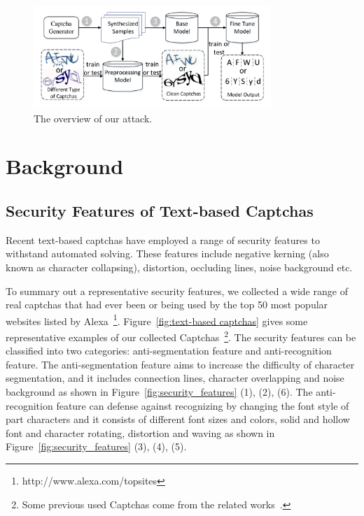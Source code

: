 \begin{figure}[!t]
  \centering
  \includegraphics[width=0.8\textwidth]{fig/overview/overview.pdf}
  \caption{The overview of our attack.}
  \label{fig:overview}
\end{figure}

\section{Background}
\subsection{Security Features of Text-based Captchas \label{section: security_features}}
Recent text-based captchas have employed a range of security features to withstand automated solving. These features include negative
kerning (also known as character collapsing), distortion, occluding lines, noise background etc.

To summary out a representative security features, we collected a wide range of real captchas that had ever been or being used by the top 50 most popular websites listed by Alexa~\footnote{http://www.alexa.com/topsites}. Figure~\ref{fig:text-based captchas} gives some representative examples of our collected Captchas~\footnote{Some previous used Captchas come from the related works~\cite{Gao2013The,Gao2016A,Bursztein2011Text}.}.
The security features can be classified into two categories: anti-segmentation feature and anti-recognition feature. The anti-segmentation feature aims to increase the difficulty of character segmentation, and it includes connection lines, character overlapping and noise background as shown in Figure~\ref{fig:security_features} (1), (2), (6). 
The anti-recognition feature can defense against recognizing by changing the font style of part characters and it consists of different font sizes and colors, solid and hollow font and character rotating, distortion and waving as shown in Figure~\ref{fig:security_features} (3), (4), (5).

